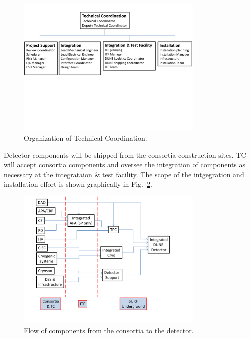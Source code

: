 \begin{figure}[htb]
  \begin{center}
    \includegraphics[width=0.8\textwidth]{far-detector-generic/figures/TP_TC_Org_Chart}
    \caption{Organization of Technical Coordination.}
    \label{fig:TC_orgchart}
  \end{center}
\end{figure}

Detector components will be shipped from the consortia construction
sites. TC will accept consortia components and oversee the integration
of components as necessary at the integrataion \& test facility. The
scope of the intgegration and installation effort is shown graphically
in Fig.~\ref{fig:TC_flow}.
\begin{figure}[htb]
  \begin{center}
    \includegraphics[width=0.8\textwidth]{far-detector-generic/figures/DUNE_deliverable_flow}
    \caption{Flow of components from the consortia to the detector.}
    \label{fig:TC_flow}
  \end{center}
\end{figure}


